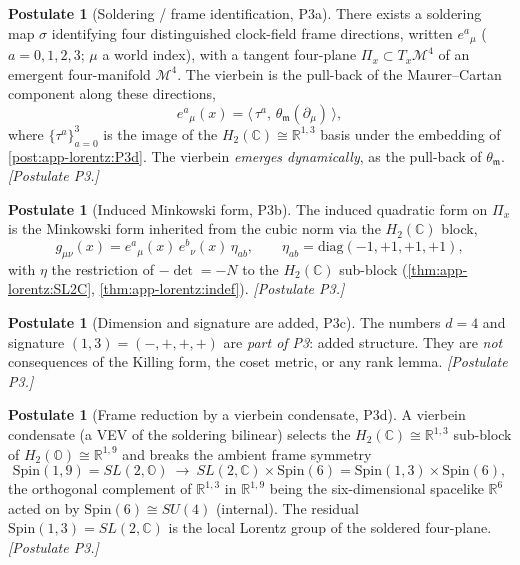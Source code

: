 \documentclass[11pt]{article}
\theoremstyle{plain}
\theoremstyle{definition}
\newtheorem{postulate}[theorem]{Postulate}
\theoremstyle{remark}
\begin{document}
\begin{postulate}[Soldering / frame identification, P3a]
\label{post:app-lorentz:P3a}
There exists a soldering map $\sigma$ identifying four distinguished clock-field
frame directions, written $e^{a}{}_{\mu}$ ($a=0,1,2,3$; $\mu$ a world index), with a
tangent four-plane $\Pi_{x}\subset T_{x}\mathcal{M}^{4}$ of an emergent four-manifold
$\mathcal{M}^{4}$. The vierbein is the pull-back of the Maurer--Cartan component
along these directions,
\begin{equation}
\label{eq:app-lorentz:vierbein}
e^{a}{}_{\mu}(x)=\big\langle\,\tau^{a},\,\theta_{\mathfrak{m}}(\partial_{\mu})\,\big\rangle,
\end{equation}
where $\{\tau^{a}\}_{a=0}^{3}$ is the image of the $H_{2}(\mathbb{C})\cong\mathbb{R}^{1,3}$
basis under the embedding of \autoref{post:app-lorentz:P3d}. The vierbein
\emph{emerges dynamically}, as the pull-back of $\theta_{\mathfrak{m}}$. \emph{[Postulate P3.]}
\end{postulate}

\begin{postulate}[Induced Minkowski form, P3b]
\label{post:app-lorentz:P3b}
The induced quadratic form on $\Pi_{x}$ is the Minkowski form inherited from the
cubic norm via the $H_{2}(\mathbb{C})$ block,
\begin{equation}
\label{eq:app-lorentz:metric}
g_{\mu\nu}(x)=e^{a}{}_{\mu}(x)\,e^{b}{}_{\nu}(x)\,\eta_{ab},
\qquad \eta_{ab}=\mathrm{diag}(-1,+1,+1,+1),
\end{equation}
with $\eta$ the restriction of $-\det=-N$ to the $H_{2}(\mathbb{C})$ sub-block
(\autoref{thm:app-lorentz:SL2C}, \autoref{thm:app-lorentz:indef}). \emph{[Postulate P3.]}
\end{postulate}

\begin{postulate}[Dimension and signature are added, P3c]
\label{post:app-lorentz:P3c}
The numbers $d=4$ and signature $(1,3)=(-,+,+,+)$ are \emph{part of P3}: added
structure. They are \emph{not} consequences of the Killing form, the coset metric, or
any rank lemma. \emph{[Postulate P3.]}
\end{postulate}

\begin{postulate}[Frame reduction by a vierbein condensate, P3d]
\label{post:app-lorentz:P3d}
A vierbein condensate (a VEV of the soldering bilinear) selects the
$H_{2}(\mathbb{C})\cong\mathbb{R}^{1,3}$ sub-block of
$H_{2}(\mathbb{O})\cong\mathbb{R}^{1,9}$ and breaks the ambient frame symmetry
\begin{equation}
\label{eq:app-lorentz:reduction}
\mathrm{Spin}(1,9)=SL(2,\mathbb{O})\ \longrightarrow\
SL(2,\mathbb{C})\times \mathrm{Spin}(6)=\mathrm{Spin}(1,3)\times\mathrm{Spin}(6),
\end{equation}
the orthogonal complement of $\mathbb{R}^{1,3}$ in $\mathbb{R}^{1,9}$ being the
six-dimensional spacelike $\mathbb{R}^{6}$ acted on by $\mathrm{Spin}(6)\cong SU(4)$
(internal). The residual $\mathrm{Spin}(1,3)=SL(2,\mathbb{C})$ is the local Lorentz
group of the soldered four-plane. \emph{[Postulate P3.]}
\end{postulate}
\end{document}

